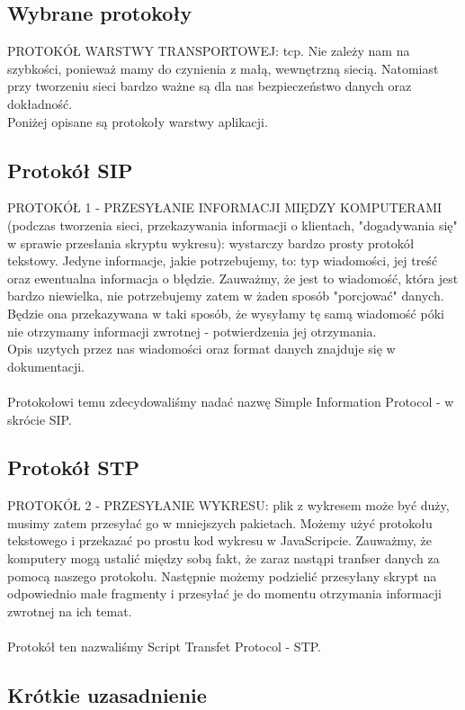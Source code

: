 \subsection{Wybrane protokoły}

PROTOKÓŁ WARSTWY TRANSPORTOWEJ: tcp. Nie zależy nam na szybkości, ponieważ mamy do czynienia z małą, wewnętrzną siecią. Natomiast przy tworzeniu sieci bardzo ważne są dla nas bezpieczeństwo danych oraz dokładność.\\
Poniżej opisane są protokoły warstwy aplikacji.

\subsection{Protokół SIP}

PROTOKÓŁ 1 - PRZESYŁANIE INFORMACJI MIĘDZY KOMPUTERAMI (podczas tworzenia sieci, przekazywania informacji o klientach, "dogadywania się" w sprawie przesłania skryptu wykresu): wystarczy bardzo prosty protokół tekstowy. Jedyne informacje, jakie potrzebujemy, to: typ wiadomości, jej treść oraz ewentualna informacja o błędzie. Zauważmy, że jest to wiadomość, która jest bardzo niewielka, nie potrzebujemy zatem w żaden sposób "porcjować" danych. Będzie ona przekazywana w taki sposób, że wysyłamy tę samą wiadomość póki nie otrzymamy informacji zwrotnej - potwierdzenia jej otrzymania. \\
\indent Opis uzytych przez nas wiadomości oraz format danych znajduje się w dokumentacji.\\
\\
\indent Protokołowi temu zdecydowaliśmy nadać nazwę Simple Information Protocol - w skrócie SIP.

\subsection{Protokół STP}
PROTOKÓŁ 2 - PRZESYŁANIE WYKRESU: plik z wykresem może być duży, musimy zatem przesyłać go w mniejszych pakietach. Możemy użyć protokołu tekstowego i przekazać po prostu kod wykresu w JavaScripcie. Zauważmy, że komputery mogą ustalić między sobą fakt, że zaraz nastąpi tranfser danych za pomocą naszego protokołu. Następnie możemy podzielić przesyłany skrypt na odpowiednio małe fragmenty i przesyłać je do momentu otrzymania informacji zwrotnej na ich temat.\\
\\
\indent Protokół ten nazwaliśmy Script Transfet Protocol - STP.

\subsection{Krótkie uzasadnienie}

